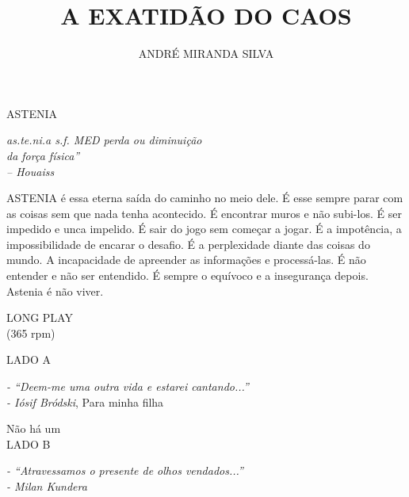 \documentclass[20pt]{book}
\title{A EXATIDÃO DO CAOS}
\author{ANDRÉ MIRANDA SILVA}
\date{}
\begin{document}
\maketitle

\newpage
\thispagestyle{empty}
\mbox{}
\newpage

\par\null\vfill
\begin{center}\Large{ASTENIA}\end{center}
\begin{flushright}
\textit{
as.te.ni.a s.f. MED perda ou diminuição\\
da força física”\\
– Houaiss}
\end{flushright}
\clearpage
ASTENIA é essa eterna saída do caminho no meio dele. É esse
sempre parar com as coisas sem que nada tenha acontecido. É
encontrar muros e não subi-los. É ser impedido e unca impelido. É
sair do jogo sem começar a jogar. É a impotência, a impossibilidade
de encarar o desafio. É a perplexidade diante das coisas do mundo. A
incapacidade de apreender as informações e processá-las. É não
entender e não ser entendido. É sempre o equívoco e a insegurança
depois. Astenia é não viver.
\clearpage

\clearpage

\clearpage

\clearpage

\clearpage

\clearpage

\clearpage

\clearpage

\clearpage

\clearpage

\clearpage

\clearpage

\clearpage

\clearpage

\clearpage

\clearpage

\clearpage

\par\null\vfill
\begin{center}
\Large{
LONG PLAY\\
(365 rpm)}
\end{center}

\clearpage

\par\null\vfill
\begin{center}
\Large{
LADO A}
\end{center}
\begin{flushright}
\large{
\textit{- “Deem-me uma outra vida e estarei cantando...”\\
- Iósif Bródski}, Para minha filha
}
\end{flushright}


\clearpage

\clearpage

\clearpage

\clearpage

\clearpage

\clearpage

\clearpage

\clearpage

\clearpage

\clearpage

\clearpage


\par\null\vfill
\begin{center}
\large{Não há um}\\
\Large{
LADO B}
\end{center}
\begin{flushright}
\large{
\textit{- “Atravessamos o presente de olhos vendados...”\\
- Milan Kundera}
}
\end{flushright}
\end{document}
